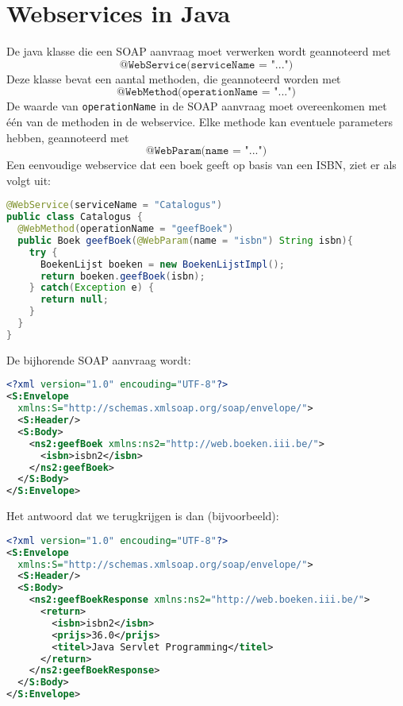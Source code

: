 \documentclass{report}
\begin{document}
\section{Webservices in Java}
De java klasse die een SOAP aanvraag moet verwerken wordt geannoteerd met 
$$\texttt{@WebService(serviceName = "...")}$$
Deze klasse bevat een aantal methoden, die geannoteerd worden met 
$$\texttt{@WebMethod(operationName = "...")}$$
De waarde van \texttt{operationName} in de SOAP aanvraag moet overeenkomen met één van de methoden in de webservice.
Elke methode kan eventuele parameters hebben, geannoteerd met
$$\texttt{@WebParam(name = "...")}$$
Een eenvoudige webservice dat een boek geeft op basis van een ISBN, ziet er als volgt uit:
\begin{lstlisting}[language=java]
@WebService(serviceName = "Catalogus")
public class Catalogus {
  @WebMethod(operationName = "geefBoek")
  public Boek geefBoek(@WebParam(name = "isbn") String isbn){
    try {
      BoekenLijst boeken = new BoekenLijstImpl();
      return boeken.geefBoek(isbn);
    } catch(Exception e) {
      return null;
    }
  }
}
\end{lstlisting}

De bijhorende SOAP aanvraag wordt:
\begin{lstlisting}[language=xml]
<?xml version="1.0" encouding="UTF-8"?>
<S:Envelope 
  xmlns:S="http://schemas.xmlsoap.org/soap/envelope/">
  <S:Header/>
  <S:Body>
    <ns2:geefBoek xmlns:ns2="http://web.boeken.iii.be/">
      <isbn>isbn2</isbn>
    </ns2:geefBoek>
  </S:Body>
</S:Envelope>
\end{lstlisting}


Het antwoord dat we terugkrijgen is dan (bijvoorbeeld):
\begin{lstlisting}[language=xml]
<?xml version="1.0" encouding="UTF-8"?>
<S:Envelope 
  xmlns:S="http://schemas.xmlsoap.org/soap/envelope/">
  <S:Header/>
  <S:Body>
    <ns2:geefBoekResponse xmlns:ns2="http://web.boeken.iii.be/">
      <return>
        <isbn>isbn2</isbn>
        <prijs>36.0</prijs>
        <titel>Java Servlet Programming</titel>
      </return>
	</ns2:geefBoekResponse>
  </S:Body>
</S:Envelope>
\end{lstlisting}


	
\end{document}
